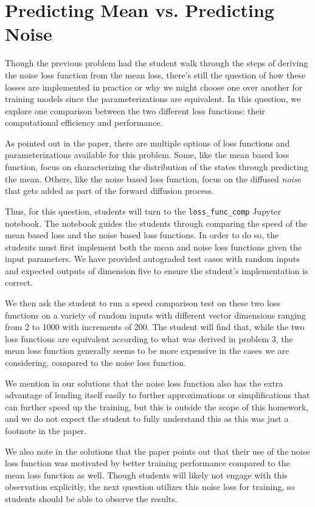 \documentclass{article}
\begin{document}
\section{Predicting Mean vs. Predicting Noise}

Though the previous problem had the student walk through the steps of deriving the noise loss function from the mean loss, there's still the question of how these losses are implemented in practice or why we might choose one over another for training models since the parameterizations are equivalent. In this question, we explore one comparison between the two different loss functions: their computational efficiency and performance.

As pointed out in the paper, there are multiple options of loss functions and parameterizations available for this problem.
Some, like the mean based loss function, focus on characterizing the distribution of the states through predicting the mean.
Others, like the noise based loss function, focus on the diffused \textit{noise} that gets added as part of the forward diffusion process.

Thus, for this question, students will turn to the \verb|loss_func_comp| Jupyter notebook. The notebook guides the students through comparing the speed of the mean based loss and the noise based loss functions. In order to do so, the students must first implement both the mean and noise loss functions given the input parameters. We have provided autograded test cases with random inputs and expected outputs of dimension five to ensure the student's implementation is correct.

We then ask the student to run a speed comparison test on these two loss functions on a variety of random inputs with different vector dimensions ranging from 2 to 1000 with increments of 200. The student will find that, while the two loss functions are equivalent according to what was derived in problem 3, the mean loss function generally seems to be more expensive in the cases we are considering, compared to the noise loss function.

We mention in our solutions that the noise loss function also has the extra advantage of lending itself easily to further approximations or simplifications that can further speed up the training, but this is outside the scope of this homework, and we do not expect the student to fully understand this as this was just a footnote in the paper.

We also note in the solutions that the paper points out that their use of the noise loss function was motivated by better training performance compared to the mean loss function as well. Though students will likely not engage with this observation explicitly, the next question utilizes this noise loss for training, so students should be able to observe the results.
\end{document}
